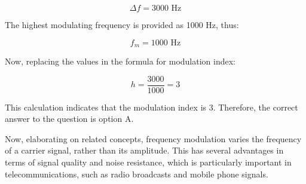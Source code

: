 \[
\Delta f = 3000 \text{ Hz}
\]

The highest modulating frequency is provided as 1000 Hz, thus:

\[
f_m = 1000 \text{ Hz}
\]

Now, replacing the values in the formula for modulation index:

\[
h = \frac{3000}{1000} = 3
\]

This calculation indicates that the modulation index is 3. Therefore, the correct answer to the question is option A.

Now, elaborating on related concepts, frequency modulation varies the frequency of a carrier signal, rather than its amplitude. This has several advantages in terms of signal quality and noise resistance, which is particularly important in telecommunications, such as radio broadcasts and mobile phone signals.


